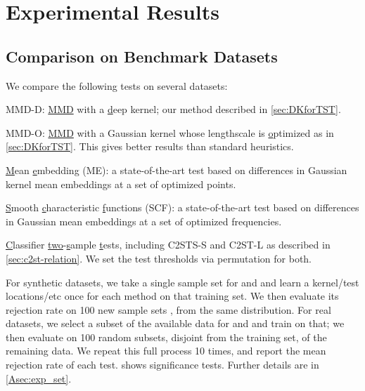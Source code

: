 \documentclass{article}
\begin{document}
\section{Experimental Results}
\label{sec:exp}



\subsection{Comparison on Benchmark Datasets} \label{sec:benchmark-exp}



We compare the following tests on several datasets:
\begin{compactitem}
    \item MMD-D: \underline{MMD} with a \underline{d}eep kernel; our method described in \cref{sec:DKforTST}.
    \item MMD-O: \underline{MMD} with a Gaussian kernel whose lengthscale is \underline{o}ptimized as in \cref{sec:DKforTST}. This gives better results than standard heuristics.
    \item \underline{M}ean \underline{e}mbedding (ME): a state-of-the-art test \citep{Chwialkowski2015,Jitkrittum2016}
    based on differences in Gaussian kernel mean embeddings
    at a set of optimized points.
    \item \underline{S}mooth \underline{c}haracteristic \underline{f}unctions (SCF): a state-of-the-art test \citep{Chwialkowski2015,Jitkrittum2016}
    based on differences in Gaussian mean embeddings at a set of optimized frequencies.
    \item \underline{C}lassifier \underline{two}-\underline{s}ample \underline{t}ests, including C2STS-S \citep{Lopez:C2ST} and C2ST-L \citep{cheng:net-logits} as described in \cref{sec:c2st-relation}.
    We set the test thresholds via permutation for both.
\end{compactitem}

For synthetic datasets,
we take a single sample set for  and 
and learn a kernel/test locations/etc once for each method on that training set.
We then evaluate its rejection rate
on 100 new sample sets , 
from the same distribution.
For real datasets,
we select a subset of the available data for  and 
and train on that;
we then evaluate on 100 random subsets, disjoint from the training set, of the remaining data.
We repeat this full process 10 times,
and report the mean rejection rate of each test.
 shows significance tests. Further details
are in \cref{Asec:exp_set}.
\end{document}
